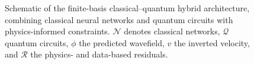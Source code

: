 \documentclass[11pt,a4paper]{article}
\begin{document}
\begin{figure}[h!]
{%
}
\caption{Schematic of the finite-basis classical--quantum hybrid architecture, combining classical neural networks and quantum circuits with physics-informed constraints. $\mathcal{N}$ denotes classical networks, $\mathcal{Q}$ quantum circuits, $\phi$ the predicted wavefield, $v$ the inverted velocity, and $\mathcal{R}$ the physics- and data-based residuals.}
\label{fig:hybrid_arch}
\end{figure}
\end{document}
